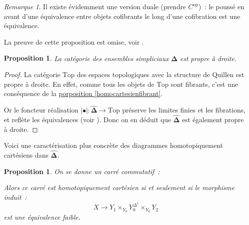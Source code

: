 \documentclass{amsart}
\newcommand{\sref}[2]{\hyperref[#2]{#1 \ref*{#2}}}
\theoremstyle{plain}
\newtheorem{prop}[theo]{Proposition}
\theoremstyle{definition}
\theoremstyle{remark}
\newtheorem{rem}[theo]{Remarque}
\newcommand{\op}{^\mathrm{op}}
\newcommand{\DEns}{\widehat{\mathbf{\Delta}}}
\newcommand{\Top}{\mathrm{Top}}
\newcommand{\ra}{\rightarrow}
\begin{document}
\begin{rem}
  Il existe évidemment une version duale (prendre $C\op$)~: le poussé en avant d'une équivalence entre objets cofibrants le long
  d'une cofibration est une équivalence.
\end{rem}

La preuve de cette proposition est omise, voir \cite[13.1.2]{Hirs}.

\begin{prop}
  La catégorie des ensembles simpliciaux $\DEns$ est propre à droite.
\end{prop}

\begin{proof}
  La catégorie $\Top$ des espaces topologiques avec la structure de Quillen est propre à droite.
  En effet, comme tous les objets de $\Top$ sont fibrants, c'est une conséquence de la \sref{porposition}{homocartesienfibrant}.

  Or le foncteur réalisation $|\bullet|:\DEns\ra \Top$ préserve les limites finies et les fibrations, et reflète les équivalences
  (voir \cite[Chp.1]{Goer}).
  Donc on en déduit que $\DEns$ est également propre à droite.
\end{proof}

Voici une caractérisation plus concrète des diagrammes homotopiquement cartésiens dans $\DEns$.

\begin{prop}
  On se donne un carré commutatif~:
  \begin{center}
  \end{center}
  Alors ce carré est homotopiquement cartésien si et seulement si le morphisme induit~:
  $$X\ra Y_1\times_{Y_0}Y_0^{\Delta^1}\times_{Y_0} Y_2$$
  est une équivalence faible.
\end{prop}
\end{document}
